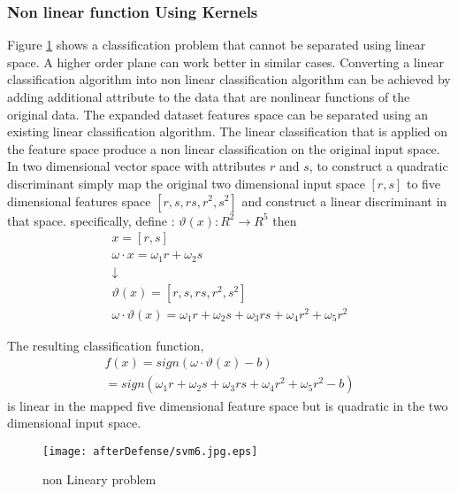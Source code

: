 \subsubsection {Non linear function Using Kernels}
Figure \ref{fig:svm6} shows a classification problem that cannot be separated using linear space. A higher order plane can work better in similar cases. Converting a linear classification algorithm into non linear classification algorithm  can be achieved by adding additional attribute to the data that are nonlinear functions of the original data. The expanded dataset features space can be separated using an  existing linear classification algorithm.  The  linear classification that is applied on the feature space produce a non linear classification on the original input space. In two dimensional vector space with attributes $r$ and $s$, to construct a quadratic  discriminant  simply map the original two dimensional input space $\left[r,s\right]$ to  five dimensional features space $\left[r,s,rs,r^2,s^2\right]$ and construct a linear discriminant in that space. specifically, define : $\vartheta(x):R^2  \rightarrow R^5$ then 
\begin{equation}
\begin{array}{l}
	x=[r,s] \\
	\omega \cdot x=\omega_1 r+ \omega_2 s \\
	\downarrow \\
	\vartheta(x)=\left[r,s,rs,r^2,s^2\right] \\
	
	 \omega \cdot \vartheta(x)= \omega_1 r+ \omega_2 s + \omega_3 rs+ \omega_4 r^2+\omega_5 r^2 
\end{array}
\label{eq:kernel}
\end{equation}  

The resulting classification function, 
\begin{equation}
\begin{array}{l}
f(x)=sign\left( \omega \cdot\vartheta(x)-b \right) \\
= sign\left( \omega_1 r+ \omega_2 s + \omega_3 rs+ \omega_4 r^2+\omega_5 r^2 -b \right) 
\end{array}
\label{eq:kern2}
\end{equation}  
is linear in the mapped five dimensional feature space but is quadratic in the two dimensional input space. 

\begin{figure}
	\centering
		\texttt{[image: afterDefense/svm6.jpg.eps]}
	\caption{non Lineary problem }
	\label{fig:svm6}
\end{figure}



